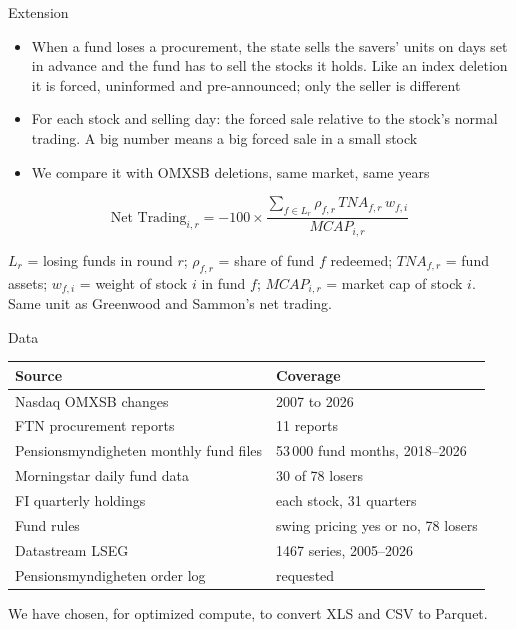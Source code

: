 \documentclass[aspectratio=169]{beamer}
\begin{document}
\begin{frame}[label=extension]{Extension}
  \begin{itemize}
    \item When a fund loses a procurement, the state sells the savers' units on days
      set in advance and the fund has to sell the stocks it holds. Like an index
      deletion it is forced, uninformed and pre-announced; only the seller is different
    \item For each stock and selling day: the forced sale relative to the stock's
      normal trading. A big number means a big forced sale in a small stock
    \item We compare it with OMXSB deletions, same market, same years
  \end{itemize}
  \[
    \text{Net Trading}_{i,r} = -100 \times \frac{\sum_{f \in L_r} \rho_{f,r}\, TNA_{f,r}\, w_{f,i}}{MCAP_{i,r}}
  \]
  {\scriptsize
  $L_r$ = losing funds in round $r$; $\rho_{f,r}$ = share of fund $f$ redeemed;
  $TNA_{f,r}$ = fund assets; $w_{f,i}$ = weight of stock $i$ in fund $f$;
  $MCAP_{i,r}$ = market cap of stock $i$. Same unit as Greenwood and Sammon's net trading.\par}
\end{frame}

\begin{frame}[label=data]{Data}
  \centering\small
  \begin{tabular}{ll}
    \toprule
    Source & Coverage \\
    \midrule
    Nasdaq OMXSB changes & 2007 to 2026 \\
    FTN procurement reports & 11 reports \\
    Pensionsmyndigheten monthly fund files & 53\,000 fund months, 2018--2026 \\
    Morningstar daily fund data & 30 of 78 losers \\
    FI quarterly holdings & each stock, 31 quarters \\
    Fund rules & swing pricing yes or no, 78 losers \\
    Datastream LSEG & 1467 series, 2005--2026 \\
    Pensionsmyndigheten order log & requested \\
    \bottomrule
  \end{tabular}

  \bigskip\raggedright\footnotesize
  We have chosen, for optimized compute, to convert XLS and CSV to Parquet.
\end{frame}
\end{document}
